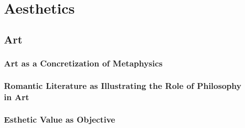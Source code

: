 \part{Aesthetics}
\label{part:aesthetics}

\chapter{Art}

    \section{Art as a Concretization of Metaphysics}

    \section{Romantic Literature as Illustrating the Role of Philosophy in Art}

    \section{Esthetic Value as Objective}